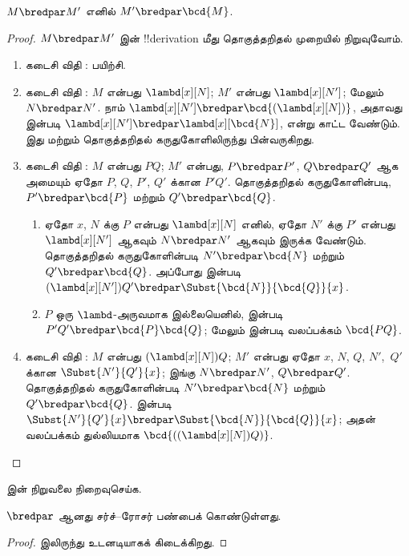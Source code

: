 \documentclass[../../../include/open-logic-section]{subfiles}
\begin{document}
\begin{lem}
  $M \bredpar M'$ எனில் $M' \bredpar \bcd{M}$.
\end{lem}
\begin{proof}
  $M \bredpar M'$ இன் !!{derivation} மீது தொகுத்தறிதல் முறையில் நிறுவுவோம்.
  \begin{enumerate}
    \item கடைசி விதி : பயிற்சி.
    \item கடைசி விதி : $M$ என்பது
      $\lambd[x][N]$; $M'$ என்பது $\lambd[x][N']$; மேலும்
      $N \bredpar N'$. நாம் $\lambd[x][N'] \bredpar
      \bcd{(\lambd[x][N])}$, அதாவது  இன்படி
      $\lambd[x][N'] \bredpar \lambd[x][\bcd{N}]$, என்று காட்ட வேண்டும்.
      இது  மற்றும் தொகுத்தறிதல் கருதுகோளிலிருந்து
      பின்வருகிறது.
    \item கடைசி விதி : $M$ என்பது $PQ$; $M'$ என்பது,
      $P \bredpar P'$, $Q \bredpar Q'$ ஆக அமையும் ஏதோ $P$, $Q$, $P'$,
      $Q'$ க்கான $P'Q'$. தொகுத்தறிதல் கருதுகோளின்படி,
      $P' \bredpar \bcd{P}$ மற்றும் $Q' \bredpar \bcd{Q}$.
      \begin{enumerate}
        \item ஏதோ $x$, $N$ க்கு $P$ என்பது $\lambd[x][N]$ எனில்,
          ஏதோ $N'$ க்கு $P'$ என்பது $\lambd[x][N']$ ஆகவும்
          $N \bredpar N'$ ஆகவும் இருக்க வேண்டும். தொகுத்தறிதல்
          கருதுகோளின்படி $N' \bredpar \bcd{N}$ மற்றும்
          $Q' \bredpar \bcd{Q}$. அப்போது  இன்படி
          $(\lambd[x][N'])Q' \bredpar
          \Subst{\bcd{N}}{\bcd{Q}}{x}$.
        \item $P$ ஒரு $\lambd$-அருவமாக இல்லையெனில்,
           இன்படி $P'Q' \bredpar
          \bcd{P}\bcd{Q}$; மேலும்  இன்படி வலப்பக்கம்
          $\bcd{PQ}$.
      \end{enumerate}
    \item கடைசி விதி : $M$ என்பது
      $(\lambd[x][N])Q$; $M'$ என்பது ஏதோ $x$, $N$, $Q$, $N'$,~$Q'$
      க்கான $\Subst{N'}{Q'}{x}$; இங்கு $N \bredpar N'$, $Q \bredpar
      Q'$. தொகுத்தறிதல் கருதுகோளின்படி $N' \bredpar \bcd{N}$ மற்றும்
      $Q' \bredpar \bcd{Q}$.  இன்படி
      $\Subst{N'}{Q'}{x} \bredpar \Subst{\bcd{N}}{\bcd{Q}}{x}$;
      அதன் வலப்பக்கம் துல்லியமாக $\bcd{((\lambd[x][N])Q)}$.
  \end{enumerate}
\end{proof}

\begin{prob}
   இன் நிறுவலை நிறைவுசெய்க.
\end{prob}

\begin{thm}
  $\bredpar$ ஆனது சர்ச்--ரோசர் பண்பைக் கொண்டுள்ளது.
\end{thm}

\begin{proof}
   இலிருந்து உடனடியாகக் கிடைக்கிறது.
\end{proof}
\end{document}
